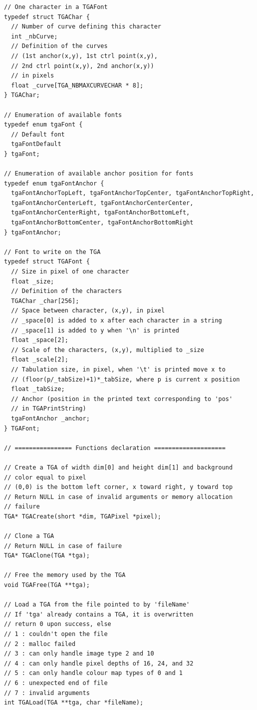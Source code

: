 \documentclass[12pt, a4paper]{article}
\begin{document}
\begin{scriptsize}
\begin{ttfamily}
\begin{lstlisting}
// One character in a TGAFont
typedef struct TGAChar {
  // Number of curve defining this character
  int _nbCurve;
  // Definition of the curves 
  // (1st anchor(x,y), 1st ctrl point(x,y), 
  // 2nd ctrl point(x,y), 2nd anchor(x,y))
  // in pixels
  float _curve[TGA_NBMAXCURVECHAR * 8];
} TGAChar;

// Enumeration of available fonts
typedef enum tgaFont {
  // Default font
  tgaFontDefault
} tgaFont;

// Enumeration of available anchor position for fonts
typedef enum tgaFontAnchor {
  tgaFontAnchorTopLeft, tgaFontAnchorTopCenter, tgaFontAnchorTopRight, 
  tgaFontAnchorCenterLeft, tgaFontAnchorCenterCenter,
  tgaFontAnchorCenterRight, tgaFontAnchorBottomLeft,
  tgaFontAnchorBottomCenter, tgaFontAnchorBottomRight 
} tgaFontAnchor;

// Font to write on the TGA
typedef struct TGAFont {
  // Size in pixel of one character
  float _size;
  // Definition of the characters
  TGAChar _char[256];
  // Space between character, (x,y), in pixel
  // _space[0] is added to x after each character in a string
  // _space[1] is added to y when '\n' is printed
  float _space[2];
  // Scale of the characters, (x,y), multiplied to _size
  float _scale[2];
  // Tabulation size, in pixel, when '\t' is printed move x to 
  // (floor(p/_tabSize)+1)*_tabSize, where p is current x position
  float _tabSize;
  // Anchor (position in the printed text corresponding to 'pos'
  // in TGAPrintString)
  tgaFontAnchor _anchor;
} TGAFont;

// ================ Functions declaration ====================

// Create a TGA of width dim[0] and height dim[1] and background
// color equal to pixel
// (0,0) is the bottom left corner, x toward right, y toward top
// Return NULL in case of invalid arguments or memory allocation
// failure
TGA* TGACreate(short *dim, TGAPixel *pixel);

// Clone a TGA
// Return NULL in case of failure
TGA* TGAClone(TGA *tga);

// Free the memory used by the TGA
void TGAFree(TGA **tga);

// Load a TGA from the file pointed to by 'fileName'
// If 'tga' already contains a TGA, it is overwritten
// return 0 upon success, else
// 1 : couldn't open the file
// 2 : malloc failed
// 3 : can only handle image type 2 and 10
// 4 : can only handle pixel depths of 16, 24, and 32
// 5 : can only handle colour map types of 0 and 1
// 6 : unexpected end of file
// 7 : invalid arguments
int TGALoad(TGA **tga, char *fileName);


\end{lstlisting}
\end{ttfamily}
\end{scriptsize}
\end{document}
